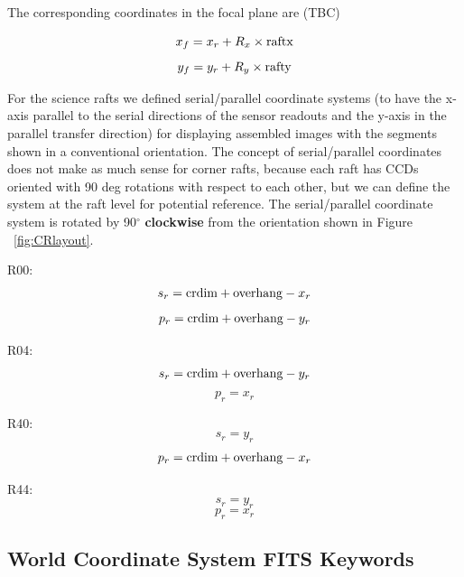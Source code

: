 \documentclass{article}[12pt]
\begin{document}
{The corresponding coordinates in the focal plane are (TBC)

\begin{equation}
x_f = x_r + R_x \times {\rm raftx}
\end{equation}
\begin{equation}
y_f = y_r + R_y \times {\rm rafty}
\end{equation}

For the science rafts we defined serial/parallel coordinate systems (to have the x-axis parallel to the serial directions of the sensor readouts and the y-axis in the parallel transfer direction) for displaying assembled images with the segments shown in a conventional orientation.  The concept of serial/parallel coordinates does not make as much sense for corner rafts, because each raft has CCDs oriented with 90 deg rotations with respect to each other, but we can define the system at the raft level for potential reference.  The serial/parallel coordinate system is rotated by 90$^\circ$ {\bf clockwise} from the orientation shown in Figure ~\ref{fig:CRlayout}.

R00:
\begin{equation}
s_r =  {\rm crdim} + {\rm overhang} - x_r
\end{equation}
\begin{equation}
p_r = {\rm crdim} + {\rm overhang} - y_r
\end{equation}

R04:
\begin{equation}
s_r = {\rm crdim} + {\rm overhang} - y_r
\end{equation}
\begin{equation}
p_r =  x_r
\end{equation}

R40:
\begin{equation}
s_r = y_r
\end{equation}
\begin{equation}
p_r =  {\rm crdim} + {\rm overhang} - x_r
\end{equation}

R44:
\begin{equation}
s_r = y_r
\end{equation}
\begin{equation}
p_r = x_r
\end{equation}

\subsection{World Coordinate System FITS Keywords}

}
\end{document}
